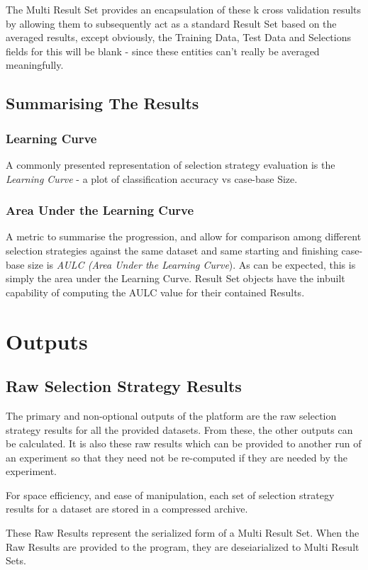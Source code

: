 \documentclass[a4paper,11pt]{report}
\begin{document}
The Multi Result Set provides an encapsulation of these k cross validation results by allowing them to subsequently act as a standard Result Set based on the averaged results, except obviously, the Training Data, Test Data and Selections fields for this will be blank - since these entities can't really be averaged meaningfully.

\subsection{Summarising The Results}
\subsubsection{Learning Curve}\label{sec:multiresultset}
A commonly presented representation of selection strategy evaluation is the \emph{Learning Curve} - a plot of classification accuracy vs case-base Size.

\subsubsection{Area Under the Learning Curve}
A metric to summarise the progression, and allow for comparison among different selection strategies against the same dataset and same starting and finishing case-base size is \emph{AULC (Area Under the Learning Curve}). As can be expected, this is simply the area under the Learning Curve. Result Set objects have the inbuilt capability of computing the AULC value for their contained Results.

\section{Outputs}

\subsection{Raw Selection Strategy Results}
The primary and non-optional outputs of the platform are the raw selection strategy results for all the provided datasets. From these, the other outputs can be calculated. It is also these raw results which can be provided to another run of an experiment so that they need not be re-computed if they are needed by the experiment. 

For space efficiency, and ease of manipulation, each set of selection strategy results for a dataset are stored in a compressed archive.

These Raw Results represent the serialized form of a Multi Result Set. When the Raw Results are provided to the program, they are deseiarialized to Multi Result Sets.
\end{document}
